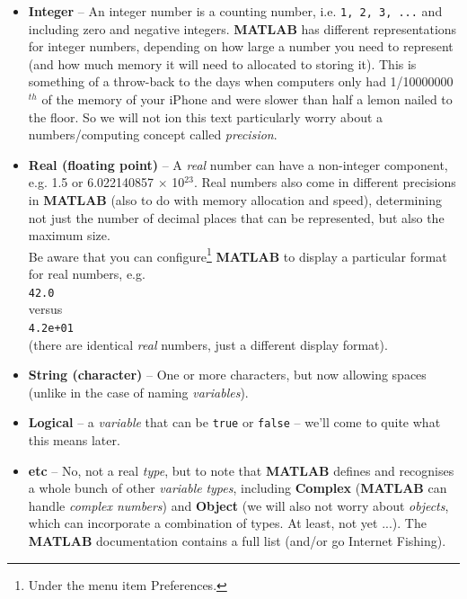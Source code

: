 \documentclass{tufte-book} %
\begin{document}
\begin{itemize}
\setlength{\itemindent}{.2in}
\item \textbf{Integer} -- An integer number is a counting number, i.e. \texttt{1, 2, 3, ...} and including zero and negative integers.
 \textbf{MATLAB} has different representations for integer numbers, depending on how large a number you need to represent (and how much memory it will need to allocated to storing it). This is something of a throw-back to the days when computers only had 1/10000000\(^{th}\) of the memory of your iPhone and were slower than half a lemon nailed to the floor. So we will not ion this text particularly worry about a numbers/computing concept called \textit{precision}.
\item \textbf{Real (floating point)} -- A \textit{real} number can have a non-integer component, e.g. 1.5 or 6.022140857 \(\times\) 10\(^{23}\). Real numbers also come in different precisions in \textbf{MATLAB} (also to do with memory allocation and speed), determining not just the number of decimal places that can be represented, but also the maximum size.
\\Be aware that you can configure\footnote{Under the menu item \textsf{Preferences}.} \textbf{MATLAB} to display a particular format for real numbers, e.g.
\\\texttt{42.0}
\\versus
\\\texttt{4.2e+01}
\\(there are identical \textit{real} numbers, just a different display format).
\item \textbf{String (character)} -- One or more characters, but now allowing spaces (unlike in the case of naming \textit{variables}).
\item \textbf{Logical} -- a \textit{variable} that can be \texttt{true} or \texttt{false} -- we'll come to quite what this means later.
\item \textbf{etc} -- No, not a real \textit{type}, but to note that \textbf{MATLAB} defines and recognises a whole bunch of other \textit{variable} \textit{types}, including \textbf{Complex} (\textbf{MATLAB} can handle \textit{complex numbers}) and \textbf{Object} (we will also not worry about \textit{objects}, which can incorporate a combination of types. At least, not yet ...). The \textbf{MATLAB} documentation contains a full list (and/or go Internet Fishing).
\end{itemize}
\end{document}
